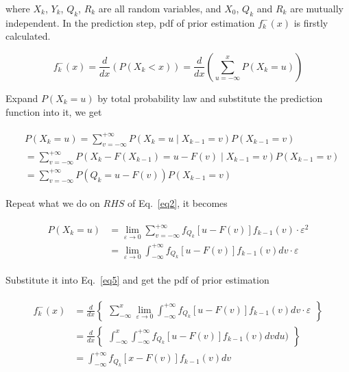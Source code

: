 \documentclass[conference]{IEEEtran}
\begin{document}
	where $X_{k}$, $Y_{k}$, $Q_{k}$, $R_{k}$ are all random variables, and $X_{0}$, $Q_{k}$ and $R_{k}$ are mutually independent. In the prediction step, pdf of prior estimation $f_{k}^{-}(x)$ is firstly calculated.
	
	\begin{equation}
		f_{k}^{-}(x)=\frac{d}{dx}(P(X_{k}<x))=\frac{d}{dx}(\sum_{u=-\infty}^{x}P(X_{k}=u))
		\label{eq5}
	\end{equation}
	
	Expand $P(X_{k}=u)$ by total probability law and substitute the prediction function into it, we get
	
	\begin{equation}
	\begin{split}
	\begin{aligned}
	&P(X_{k}=u)=\sum_{v=-\infty}^{+\infty}P(X_{k}=u\mid X_{k-1}=v)P(X_{k-1}=v)\\
	&=\sum_{v=-\infty}^{+\infty}P(X_{k}-F(X_{k-1})=u-F(v)\mid X_{k-1}=v)P(X_{k-1}=v)\\
	&=\sum_{v=-\infty}^{+\infty}P(Q_{k}=u-F(v))P(X_{k-1}=v)
	\nonumber
	\end{aligned}
	\end{split}
	\end{equation}
	
	Repeat what we do on $RHS$ of Eq.~\ref{eq2}, it becomes
	
	\begin{equation}
	\begin{split}
	\begin{aligned}
	P(X_{k}=u)&=\lim_{\varepsilon \rightarrow 0 }\sum_{v=-\infty}^{+\infty}f_{Q_{k}}[u-F(v)]f_{k-1}(v)\cdot \varepsilon ^{2}\\
	&=\lim_{\varepsilon \rightarrow 0}\int_{-\infty}^{+\infty}f_{Q_{k}}[u-F(v)]f_{k-1}(v)dv \cdot \varepsilon
	\nonumber
	\end{aligned}
	\end{split}
	\end{equation}
	
	Substitute it into Eq.~\ref{eq5} and get the pdf of prior estimation
	
	\begin{equation}
	\begin{split}
	\begin{aligned}
	f_{k}^{-}(x)&=\frac{d}{dx}\begin{Bmatrix}
	{\sum_{-\infty}^{x}\lim_{\varepsilon \rightarrow 0}\int_{-\infty}^{+\infty}f_{Q_{k}}[u-F(v)]f_{k-1}(v)dv \cdot \varepsilon}
	\end{Bmatrix} \\
	&=\frac{d}{dx}\begin{Bmatrix}
	\int_{-\infty}^{x}\int_{-\infty}^{+\infty}f_{Q_{k}}[u-F(v)]f_{k-1}(v)dvdu)
	\end{Bmatrix}\\
	&=\int_{-\infty}^{+\infty}f_{Q_{k}}[x-F(v)]f_{k-1}(v)dv
	\label{eq6}
	\end{aligned}
	\end{split}
	\end{equation}
	
\end{document}
